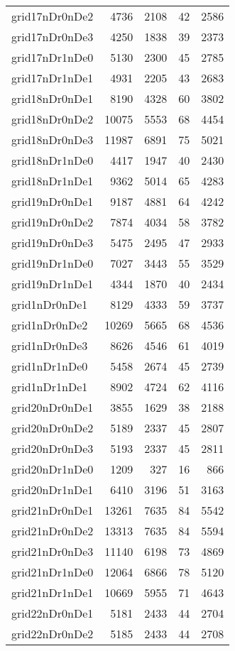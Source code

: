 \documentclass[../../../thesis.tex]{subfiles}
\begin{document}
\begin{longtable}{lrrrr}
grid17nDr0nDe2 & 4736 & 2108 & 42 & 2586 \\
grid17nDr0nDe3 & 4250 & 1838 & 39 & 2373 \\
grid17nDr1nDe0 & 5130 & 2300 & 45 & 2785 \\
grid17nDr1nDe1 & 4931 & 2205 & 43 & 2683 \\
grid18nDr0nDe1 & 8190 & 4328 & 60 & 3802 \\
grid18nDr0nDe2 & 10075 & 5553 & 68 & 4454 \\
grid18nDr0nDe3 & 11987 & 6891 & 75 & 5021 \\
grid18nDr1nDe0 & 4417 & 1947 & 40 & 2430 \\
grid18nDr1nDe1 & 9362 & 5014 & 65 & 4283 \\
grid19nDr0nDe1 & 9187 & 4881 & 64 & 4242 \\
grid19nDr0nDe2 & 7874 & 4034 & 58 & 3782 \\
grid19nDr0nDe3 & 5475 & 2495 & 47 & 2933 \\
grid19nDr1nDe0 & 7027 & 3443 & 55 & 3529 \\
grid19nDr1nDe1 & 4344 & 1870 & 40 & 2434 \\
grid1nDr0nDe1 & 8129 & 4333 & 59 & 3737 \\
grid1nDr0nDe2 & 10269 & 5665 & 68 & 4536 \\
grid1nDr0nDe3 & 8626 & 4546 & 61 & 4019 \\
grid1nDr1nDe0 & 5458 & 2674 & 45 & 2739 \\
grid1nDr1nDe1 & 8902 & 4724 & 62 & 4116 \\
grid20nDr0nDe1 & 3855 & 1629 & 38 & 2188 \\
grid20nDr0nDe2 & 5189 & 2337 & 45 & 2807 \\
grid20nDr0nDe3 & 5193 & 2337 & 45 & 2811 \\
grid20nDr1nDe0 & 1209 & 327 & 16 & 866 \\
grid20nDr1nDe1 & 6410 & 3196 & 51 & 3163 \\
grid21nDr0nDe1 & 13261 & 7635 & 84 & 5542 \\
grid21nDr0nDe2 & 13313 & 7635 & 84 & 5594 \\
grid21nDr0nDe3 & 11140 & 6198 & 73 & 4869 \\
grid21nDr1nDe0 & 12064 & 6866 & 78 & 5120 \\
grid21nDr1nDe1 & 10669 & 5955 & 71 & 4643 \\
grid22nDr0nDe1 & 5181 & 2433 & 44 & 2704 \\
grid22nDr0nDe2 & 5185 & 2433 & 44 & 2708 \\

\end{longtable}
\end{document}
